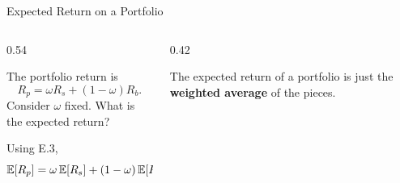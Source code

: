 \documentclass[9pt,english,aspectratio=169]{beamer}
\begin{document}
\begin{frame}{Expected Return on a Portfolio}

  \begin{columns}[T]
    \begin{column}{0.54\textwidth}

      \begin{questionbox}
        The portfolio return is
          \[
            R_p = \omega R_s + (1 - \omega) R_b.
          \]
        Consider $\omega$ fixed. What is the expected return?
      \end{questionbox}
      \pause
      \vspace{0.5em}
      \begin{answerbox}
        Using E.3,
        \[
          \mathbb{E}[R_p] = \omega\, \mathbb{E}[R_s] + (1 - \omega)\, \mathbb{E}[R_b].
        \]
      \end{answerbox}
    \end{column}
    \begin{column}{0.42\textwidth}
      \vspace{1.5em}
      \pause
      \begin{insightbox}
        The expected return of a portfolio is just the \textbf{weighted
        average} of the pieces.
      \end{insightbox}
    \end{column}
  \end{columns}

\end{frame}

\end{document}
